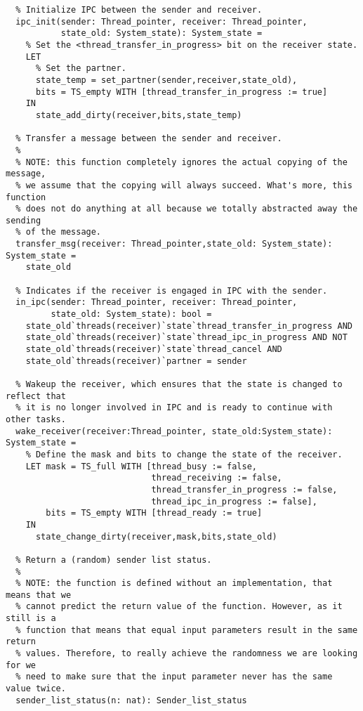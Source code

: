 \begin{lstlisting}
  % Initialize IPC between the sender and receiver.
  ipc_init(sender: Thread_pointer, receiver: Thread_pointer,
           state_old: System_state): System_state =
    % Set the <thread_transfer_in_progress> bit on the receiver state.
    LET 
      % Set the partner.
      state_temp = set_partner(sender,receiver,state_old),
      bits = TS_empty WITH [thread_transfer_in_progress := true]
    IN
      state_add_dirty(receiver,bits,state_temp)

  % Transfer a message between the sender and receiver.
  %
  % NOTE: this function completely ignores the actual copying of the message,
  % we assume that the copying will always succeed. What's more, this function 
  % does not do anything at all because we totally abstracted away the sending
  % of the message.
  transfer_msg(receiver: Thread_pointer,state_old: System_state): System_state =
    state_old

  % Indicates if the receiver is engaged in IPC with the sender.
  in_ipc(sender: Thread_pointer, receiver: Thread_pointer, 
         state_old: System_state): bool =
    state_old`threads(receiver)`state`thread_transfer_in_progress AND
    state_old`threads(receiver)`state`thread_ipc_in_progress AND NOT
    state_old`threads(receiver)`state`thread_cancel AND 
    state_old`threads(receiver)`partner = sender

  % Wakeup the receiver, which ensures that the state is changed to reflect that
  % it is no longer involved in IPC and is ready to continue with other tasks. 
  wake_receiver(receiver:Thread_pointer, state_old:System_state): System_state =
    % Define the mask and bits to change the state of the receiver.
    LET mask = TS_full WITH [thread_busy := false,
                             thread_receiving := false,
                             thread_transfer_in_progress := false,
                             thread_ipc_in_progress := false],
        bits = TS_empty WITH [thread_ready := true]
    IN
      state_change_dirty(receiver,mask,bits,state_old)

  % Return a (random) sender list status.
  %
  % NOTE: the function is defined without an implementation, that means that we 
  % cannot predict the return value of the function. However, as it still is a
  % function that means that equal input parameters result in the same return
  % values. Therefore, to really achieve the randomness we are looking for we
  % need to make sure that the input parameter never has the same value twice.
  sender_list_status(n: nat): Sender_list_status


\end{lstlisting}
